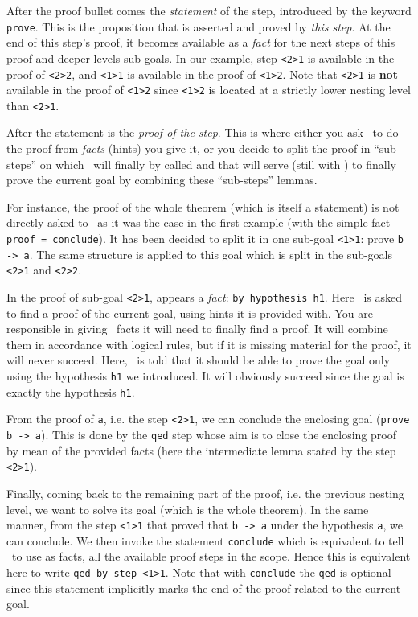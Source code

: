 \medskip
After the proof bullet comes the {\em statement} of the step,
introduced by the keyword \lstinline{prove}.  This is the
proposition that is asserted and proved by {\em this step}.  At the end of
this step's proof, it becomes available as a {\em fact} for the next steps
of this proof and deeper levels sub-goals.  In our example, step
\lstinline"<2>1" is available in the proof of \lstinline"<2>2", and
\lstinline"<1>1" is available in the proof of \lstinline"<1>2".  Note
that \lstinline"<2>1" is {\bf not} available in the proof of \lstinline"<1>2"
since \lstinline"<1>2" is located at a strictly lower nesting level
than \lstinline"<2>1".

\medskip
After the statement is the {\em proof of the step}. This is where
either you ask \zenon\ to do the proof from {\em facts} (hints) you
give it, or you decide to split the proof in ``sub-steps'' on which
\zenon\ will finally by called and that will serve (still with \zenon)
to finally prove the current goal by combining these ``sub-steps''
lemmas.

For instance, the proof of the whole theorem (which is itself a
statement) is not directly asked to \zenon\ as it was the case in the
first example (with the simple fact \lstinline"proof = conclude").  It has been decided to
split it in one sub-goal \lstinline"<1>1": prove \lstinline"b -> a". The same
structure is applied to this goal which is split in the sub-goals
\lstinline"<2>1" and \lstinline"<2>2".

\medskip
In the proof of sub-goal \lstinline"<2>1", appears a {\em fact}:
\lstinline"by hypothesis h1". Here \zenon\ is asked to find a proof of
the current goal, using hints it is provided with. You are responsible
in giving \zenon\ facts it will need to finally find a proof. It will
combine them in accordance with logical rules, but if it is missing
material for the proof, it will never succeed. Here, \zenon\ is told
that it should be able to prove the goal only using the hypothesis
\lstinline"h1" we introduced. It will obviously succeed since the goal
is exactly the hypothesis \lstinline"h1".

From the proof of \lstinline"a", i.e. the step \lstinline"<2>1", we can conclude the
en\-clo\-sing goal (\lstinline"prove b -> a"). This is done by the \lstinline"qed"
step whose aim is to close the enclosing proof by mean of the provided
facts (here the intermediate lemma stated by the step \lstinline"<2>1").

Finally, coming back to the remaining part of the proof, i.e. the
previous nesting level, we want to solve its goal (which is the whole
theorem). In the same manner, from the step \lstinline"<1>1" that proved
that \lstinline"b -> a" under the hypothesis \lstinline"a", we can conclude. We
then invoke the statement \lstinline"conclude" which is equivalent to
tell \zenon\ to use as facts, all the available proof steps in the
scope. Hence this is equivalent here to write
\lstinline"qed by step <1>1". Note that with \lstinline"conclude" the
\lstinline"qed" is optional since this statement implicitly marks the
end of the proof related to the current goal.

